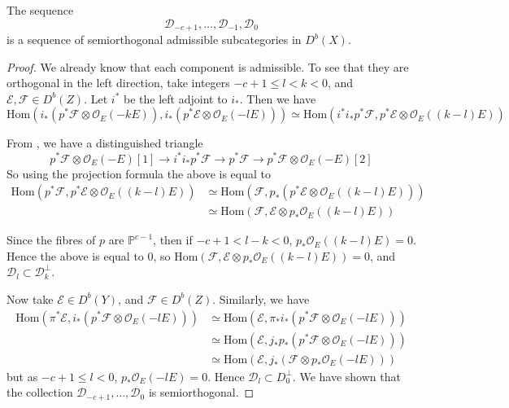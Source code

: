 \begin{lemma}{}{}
    The sequence $$\mathcal{D}_{-c+1},\dots,\mathcal{D}_{-1},\mathcal{D}_0$$is a sequence of semiorthogonal admissible subcategories in $D^b(X)$.
\end{lemma}


\begin{proof}
We already know that each component is admissible. To see that they are orthogonal in the left direction, take integers $-c+1 \leq l <k <0$, and $\mathcal{E}, \mathcal{F}\in D^b(Z)$. Let $i^*$ be the left adjoint to $i_*$. Then we have $$\mathrm{Hom}(i_{*}\left( p^{*}\mathcal{F}\otimes \mathcal{O}_{E}(-kE) \right), i_{*}\left( p^{*}\mathcal{E}\otimes \mathcal{O}_{E}(-lE) \right)  ) \simeq \mathrm{Hom}(i^{*}i_{*}p^{*}\mathcal{F}, p^{*}\mathcal{E}\otimes \mathcal{O}_{E}((k-l)E))$$

From \cite[Corollary~11.4]{Huybrechts}, we have a distinguished triangle $$p^{*}\mathcal{F}\otimes  \mathcal{O}_{E}(-E)[1]\to i^{*}i_{*}p^{*}\mathcal{F}\to p^{*}\mathcal{F}\to p^{*}\mathcal{F}\otimes \mathcal{O}_E(-E)[2]$$
So using the projection formula the above is equal to
\begin{align*}
\mathrm{Hom}(p^{*}\mathcal{F},p^{*}\mathcal{E} \otimes  \mathcal{O}_{E}((k-l)E)) &\simeq \mathrm{Hom}(\mathcal{F},p_{*}(p^{*}\mathcal{E} \otimes  \mathcal{O}_{E}((k-l)E)))  \\
&\simeq \mathrm{Hom}(\mathcal{F},\mathcal{E} \otimes p_{*} \mathcal{O}_{E}((k-l)E))
\end{align*}

Since the fibres of $p$ are $\mathbb{P}^{c-1}$, then if $-c+1<l-k<0$, $p_{*}\mathcal{O}_{E}((k-l)E)=0$. Hence the above is equal to 0, so $\mathrm{Hom}(\mathcal{F},\mathcal{E} \otimes p_{*} \mathcal{O}_{E}((k-l)E)) =0$, and $\mathcal{D}_{l}\subset \mathcal{D}_k^\perp$.

Now take $\mathcal{E}\in D^b(Y)$, and $\mathcal{F}\in D^b(Z)$. Similarly, we have
\begin{align*}
\mathrm{Hom}(\pi^{*}\mathcal{E},i_{*}(p^{*}\mathcal{F}\otimes \mathcal{O}_{E}(-lE))) &\simeq \mathrm{Hom}(\mathcal{E},\pi_{*}i_{*}(p^{*}\mathcal{F}\otimes \mathcal{O}_{E}(-lE))) \\
&\simeq \mathrm{Hom}(\mathcal{E},j_{*}p_{*}(p^{*}\mathcal{F}\otimes \mathcal{O}_{E}(-lE)))  \\
&\simeq \mathrm{Hom}(\mathcal{E},j_{*}(\mathcal{F}\otimes p_{*}\mathcal{O}_{E}(-lE)))
\end{align*}
but as $-c+1\leq l<0$, $p_{*}\mathcal{O}_{E}(-lE)=0$. Hence $\mathcal{D}_{l}\subset D_{0}^\perp$. We have shown that the collection $\mathcal{D}_{-c+1},\dots,\mathcal{D}_0$ is semiorthogonal.
\end{proof}

